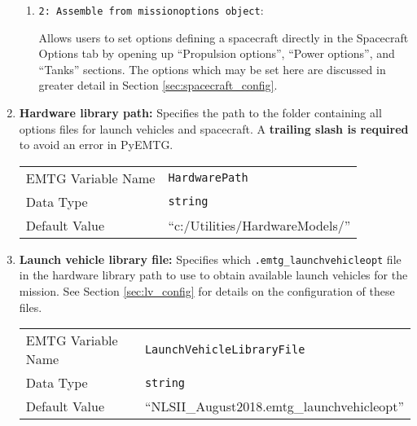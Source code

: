 \begin{enumerate}
\begin{enumerate}
        \item[] \verb|2: Assemble from missionoptions object|: 
        
        \hspace{0.25in}\begin{minipage}{0.9\linewidth}Allows users to set options defining a spacecraft directly in the Spacecraft Options tab by opening up ``Propulsion options'', ``Power options'', and ``Tanks'' sections. The options which may be set here are discussed in greater detail in Section \ref{sec:spacecraft_config}. 
        \end{minipage}
    \end{enumerate}

    \item \textbf{Hardware library path:} Specifies the path to the folder containing all options files for launch vehicles and spacecraft. A \textbf{trailing slash is required} to avoid an error in PyEMTG.
    \begin{table}[H]
        \hspace{2cm}
        \begin{tabular}{lp{5cm}}
        \ac{EMTG} Variable Name & \verb|HardwarePath| \\
        Data Type & \verb|string| \\
        Default Value & ``c:/Utilities/HardwareModels/'' \\
        \end{tabular}
    \end{table}
    
    \item \textbf{Launch vehicle library file:} Specifies which {\tt .emtg\_launchvehicleopt} file in the hardware library path to use to obtain available launch vehicles for the mission. See Section \ref{sec:lv_config} for details on the configuration of these files.
    \begin{table}[H]
        \hspace{2cm}
        \begin{tabular}{lp{5cm}}
        \ac{EMTG} Variable Name & \verb|LaunchVehicleLibraryFile| \\
        Data Type & \verb|string| \\
        Default Value & ``NLSII\_August2018.emtg\_launchvehicleopt'' \\
        \end{tabular}
    \end{table}
    

\end{enumerate}
